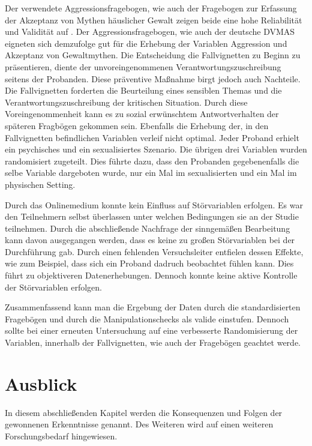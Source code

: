 Der verwendete Aggressionsfragebogen, wie auch der Fragebogen zur Erfassung der Akzeptanz von Mythen häuslicher Gewalt zeigen beide eine hohe Reliabilität und Validität auf \parencite{Peters2003, Aggressionsfragebogen}. Der Aggressionsfragebogen, wie auch der deutsche DVMAS eigneten sich demzufolge gut für die Erhebung der Variablen Aggression und Akzeptanz von Gewaltmythen. 
Die Entscheidung die Fallvignetten zu Beginn zu präsentieren, diente der unvoreingenommenen Verantwortungszuschreibung seitens der Probanden. Diese präventive Maßnahme birgt jedoch auch Nachteile. Die Fallvignetten forderten die Beurteilung eines sensiblen Themas und die Verantwortungszuschreibung der kritischen Situation. Durch diese Voreingenommenheit kann es zu sozial erwünschtem Antwortverhalten der späteren Fragbögen gekommen sein. Ebenfalls die Erhebung der, in den Fallvignetten befindlichen Variablen verleif nicht optimal. Jeder Proband erhielt ein psychisches und ein sexualisiertes Szenario. Die übrigen drei Variablen wurden randomisiert zugeteilt. Dies führte dazu, dass den Probanden gegebenenfalls die selbe Variable dargeboten wurde, nur ein Mal im sexualisierten und ein Mal im physischen Setting. 

Durch das Onlinemedium konnte kein Einfluss auf Störvariablen erfolgen. Es war den Teilnehmern selbst überlassen unter welchen Bedingungen sie an der Studie teilnehmen. Durch die abschließende Nachfrage der sinngemäßen Bearbeitung kann davon ausgegangen werden, dass es keine zu großen Störvariablen bei der Durchführung gab. Durch einen fehlenden Versuchsleiter entfielen dessen Effekte, wie zum Beispiel, dass sich ein Proband dadruch beobachtet fühlen kann. Dies führt zu objektiveren Datenerhebungen. Dennoch konnte keine aktive Kontrolle der Störvariablen erfolgen.

Zusammenfassend kann man die Ergebung der Daten durch die standardisierten Fragebögen und durch die Manipulationschecks als valide einstufen. Dennoch sollte bei einer erneuten Untersuchung auf eine verbesserte Randomisierung der Variablen, innerhalb der Fallvignetten, wie auch der Fragebögen geachtet werde. 


\section{Ausblick}    \label{sec_5.4}
In diesem abschließenden Kapitel werden die Konsequenzen und Folgen der gewonnenen Erkenntnisse genannt. Des Weiteren wird auf einen weiteren Forschungsbedarf hingewiesen.

